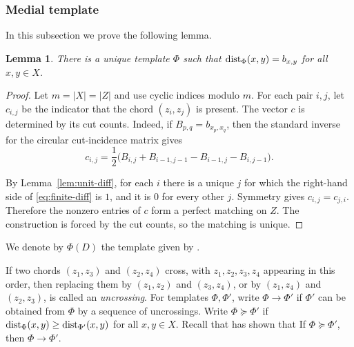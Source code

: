 \documentclass[11pt]{article}
\newtheorem{lemma}[theorem]{Lemma}
\newcommand{\dist}{\textnormal{dist}}
\begin{document}
\subsubsection{Medial template}
\label{sec: medial template}

In this subsection we prove the following lemma.

\begin{lemma}\label{lem:exact-template}
There is a unique template $\Phi$ such that
$\dist_{\Phi}(x,y)=b_{x,y}$ for all $x,y\in X$.
\end{lemma}

\begin{proof}
Let $m=|X|=|Z|$ and use cyclic indices modulo $m$.  
For each pair $i,j$, let $c_{i,j}$ be the indicator that the chord $(z_i,z_j)$ is present.  The vector $c$ is determined by its cut counts. Indeed, if $B_{p,q}=b_{x_p,x_q}$, then the standard inverse for the circular cut-incidence matrix gives
\begin{equation}\label{eq:finite-diff}
   c_{i,j}=\frac12\bigl(B_{i,j}+B_{i-1,j-1}-B_{i-1,j}-B_{i,j-1}\bigr).
\end{equation}

By Lemma~\ref{lem:unit-diff}, for each $i$ there is a unique $j$ for which the right-hand side of \eqref{eq:finite-diff} is $1$, and it is $0$ for every other $j$.  Symmetry gives $c_{i,j}=c_{j,i}$.  Therefore the nonzero entries of $c$ form a perfect matching on $Z$.  The construction is forced by the cut counts, so the matching is unique.
\end{proof}

We denote by $\Phi(D)$ the template given by .

If two chords $(z_1,z_3)$ and $(z_2,z_4)$ cross, with $z_1,z_2,z_3,z_4$ appearing in this order, then replacing them by $(z_1,z_2)$ and $(z_3,z_4)$, or by $(z_1,z_4)$ and $(z_2,z_3)$, is called an \emph{uncrossing}.  For templates $\Phi,\Phi'$, write $\Phi\to \Phi'$ if $\Phi'$ can be obtained from $\Phi$ by a sequence of uncrossings.  Write $\Phi\succeq \Phi'$ if $\dist_\Phi(x,y)\ge \dist_{\Phi'}(x,y)$ for all $x,y\in X$.
Recall that  has shown that
If $\Phi\succeq \Phi'$, then $\Phi\to \Phi'$.
\end{document}
